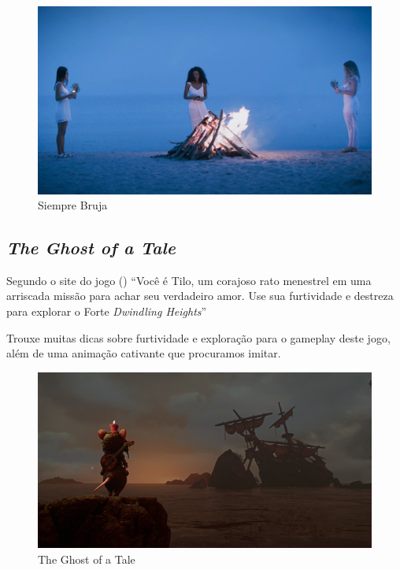 \begin{figure}[!htb] \caption{\label{siempre}Siempre Bruja} \begin{center}
\includegraphics[width=\textwidth]{imagens/SiempreBruja.jpg} \end{center}
 \end{figure}

\clearpage

\subsection{\textit{The Ghost of a Tale}} Segundo o site do jogo (\citeyear{Ghostofa36:online})  ``Você é Tilo,
um corajoso rato menestrel em uma arriscada missão para achar seu verdadeiro
amor. Use sua furtividade e destreza para explorar o Forte \textit{Dwindling
Heights}''

Trouxe muitas dicas sobre furtividade e exploração para o gameplay deste jogo, além de uma animação cativante que procuramos imitar.

\begin{figure}[!htb] \caption{\label{tale}The Ghost of a Tale} \begin{center}
\includegraphics[width=\textwidth]{imagens/tale.jpg} \end{center}
 \end{figure}

